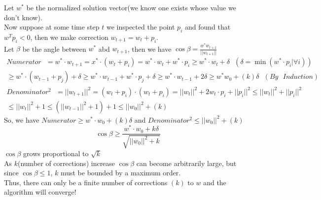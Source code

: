 \documentclass[a4paper]{article}
\begin{document}
\begin{itemize}
    Let $w^*$ be the normalized solution vector(we know one exists whose value we don't know).\\
    Now suppose at some time step $t$ we inspected the point $p_i$ and found that $w^Tp_i<0$, then we make correction $w_{t+1}=w_t+p_i$.\\
    Let $\beta$ be the angle between $w^*$ abd $w_{t+1}$, then we have $\cos{\beta}=\frac{w^*w_{t+1}}{||w_{t+1}||}$
    \begin{equation*}
    \begin{split}
        Numerator\text{ }=w^*\cdot w_{t+1}=x^*\cdot (w_t+p_i)=w^*\cdot w_{t} + w^*\cdot p_i\geq w^*\cdot w_{t}+\delta \text{ }(\delta=\min(w^*\cdot p_i|\forall i))\\
        \geq w^*\cdot(w_{t-1}+p_j)+\delta \geq w^*\cdot w_{t-1} + w^*\cdot p_j + \delta \geq w^*\cdot w_{t-1}+2\delta \geq w^*w_0+(k)\delta \text{ }(By\text{ }Induction)
    \end{split}
    \end{equation*}
    \begin{equation*}
    \begin{split}
        Denominator^2\text{ }=||w_{t+1}||^2=(w_{t}+p_i)\cdot(w_{t}+p_i)=||w_t||^2+2w_t\cdot p_i+||p_i||^2\leq ||w_t||^2+||p_i||^2\\
        \leq ||w_t||^2+1\leq (||w_{t-1}||^2+1)+1\leq ||w_0||^2+(k)
    \end{split}
    \end{equation*}
    So, we have $Numerator\geq w^*\cdot w_0+(k)\delta$ and $Denominator^2\leq ||w_0||^2+(k)$
    \begin{equation*}
        \cos{\beta}\geq \frac{w^*\cdot w_0+k\delta}{\sqrt{||w_0||^2+k}}
    \end{equation*}
    $\cos{\beta}$ grows proportional to $\sqrt{k}$\\
    As $k$(number of corrections) increase $\cos{\beta}$ can become arbitrarily large, but since $\cos{\beta}\leq 1$, $k$ must be bounded by a maximum order.\\
    Thus, there can only be a finite number of corrections $(k)$ to $w$ and the algorithm will converge!
\end{itemize}
\end{document}
